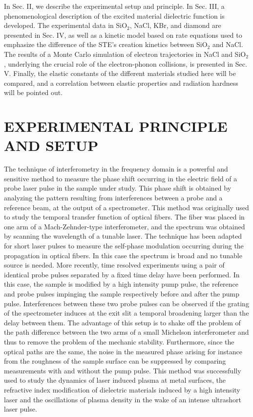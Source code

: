 \documentclass[aps,prb,reprint]{revtex4-2}
\begin{document}
In Sec. II, we describe the experimental setup and principle. In Sec. III, a phenomenological description of the excited material dielectric function is developed. The experimental data in SiO$_2$, NaCl, KBr, and diamond are presented in Sec. IV, as well as a kinetic model based on rate equations used to emphasize the difference of the STE's creation kinetics between SiO$_2$ and NaCl. The results of a Monte Carlo simulation of electron trajectories in NaCl and SiO$_2$, underlying the crucial role of the electron-phonon collisions, is presented in Sec. V. Finally, the elastic constants of the different materials studied here will be compared, and a correlation between elastic properties and radiation hardness will be pointed out.

\section{EXPERIMENTAL PRINCIPLE AND SETUP}

The technique of interferometry in the frequency domain is a powerful and sensitive method to measure the phase shift occurring in the electric field of a probe laser pulse in the sample under study. This phase shift is obtained by analyzing the pattern resulting from interferences between a probe and a reference beam, at the output of a spectrometer. This method was originally used to study the temporal transfer function of optical fibers.\cite{9} The fiber was placed in one arm of a Mach-Zehnder-type interferometer, and the spectrum was obtained by scanning the wavelength of a tunable laser. The technique has been adapted for short laser pulses to measure the self-phase modulation occurring during the propagation in optical fibers.\cite{10} In this case the spectrum is broad and no tunable source is needed. More recently, time resolved experiments using a pair of identical probe pulses separated by a fixed time delay have been performed. In this case, the sample is modified by a high intensity pump pulse, the reference and probe pulses impinging the sample respectively before and after the pump pulse.\cite{11} Interferences between these two probe pulses can be observed if the grating of the spectrometer induces at the exit slit a temporal broadening larger than the delay between them. The advantage of this setup is to shake off the problem of the path difference between the two arms of a small Michelson interferometer and thus to remove the problem of the mechanic stability. Furthermore, since the optical paths are the same, the noise in the measured phase arising for instance from the roughness of the sample surface can be suppressed by comparing measurements with and without the pump pulse. This method was successfully used to study the dynamics of laser induced plasma at metal surfaces,\cite{12} the refractive index modification of dielectric materials induced by a high intensity laser\cite{5,6} and the oscillations of plasma density in the wake of an intense ultrashort laser pulse.\cite{13}
\end{document}
